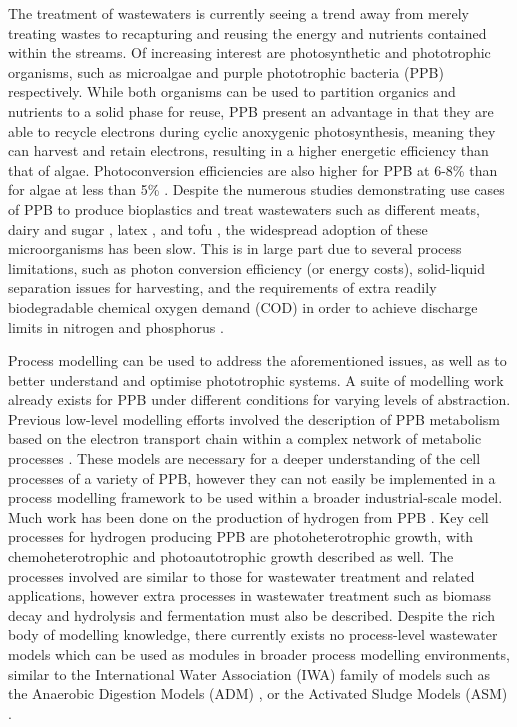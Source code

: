 The treatment of wastewaters is currently seeing a trend away from merely treating wastes to recapturing and reusing the energy and nutrients contained within the streams. Of increasing interest are photosynthetic and phototrophic organisms, such as microalgae \cite{Ward2014} and purple phototrophic bacteria (PPB) \cite{Hulsen2014} respectively. While both organisms can be used to partition organics and nutrients to a solid phase for reuse, PPB present an advantage in that they are able to recycle electrons during cyclic anoxygenic photosynthesis, meaning they can harvest and retain electrons, resulting in a higher energetic efficiency than that of algae. Photoconversion efficiencies are also higher for PPB at 6-8\% \cite{Miyake1987} than for algae at less than 5\% \cite{Posten2009}. Despite the numerous studies demonstrating use cases of PPB to produce bioplastics \cite{Melnicki2009} and treat wastewaters such as different meats, dairy and sugar \cite{Hulsen2018}, latex \cite{Kantachote2005}, and tofu \cite{Zhu1999}, the widespread adoption of these microorganisms has been slow. This is in large part due to several process limitations, such as photon conversion efficiency (or energy costs), solid-liquid separation issues for harvesting, and the requirements of extra readily biodegradable chemical oxygen demand (COD) in order to achieve discharge limits in nitrogen and phosphorus \cite{Hulsen2015}.

Process modelling can be used to address the aforementioned issues, as well as to better understand and optimise phototrophic systems. A suite of modelling work already exists for PPB under different conditions for varying levels of abstraction. Previous low-level modelling efforts involved the description of PPB metabolism based on the electron transport chain within a complex network of metabolic processes \cite{Golomysova2010}. These models are necessary for a deeper understanding of the cell processes of a variety of PPB, however they can not easily be implemented in a process modelling framework to be used within a broader industrial-scale model. Much work has been done on the production of hydrogen from PPB \cite{Eroglu2008}. Key cell processes for hydrogen producing PPB are photoheterotrophic growth, with chemoheterotrophic and photoautotrophic growth described as well. The processes involved are similar to those for wastewater treatment and related applications, however extra processes in wastewater treatment such as biomass decay and hydrolysis and fermentation must also be described. Despite the rich body of modelling knowledge, there currently exists no process-level wastewater models which can be used as modules in broader process modelling environments, similar to the International Water Association (IWA) family of models \cite{Henze1987} such as the Anaerobic Digestion Models (ADM) \cite{Batstone2002}, or the Activated Sludge Models (ASM) \cite{Gujer1999}. 

